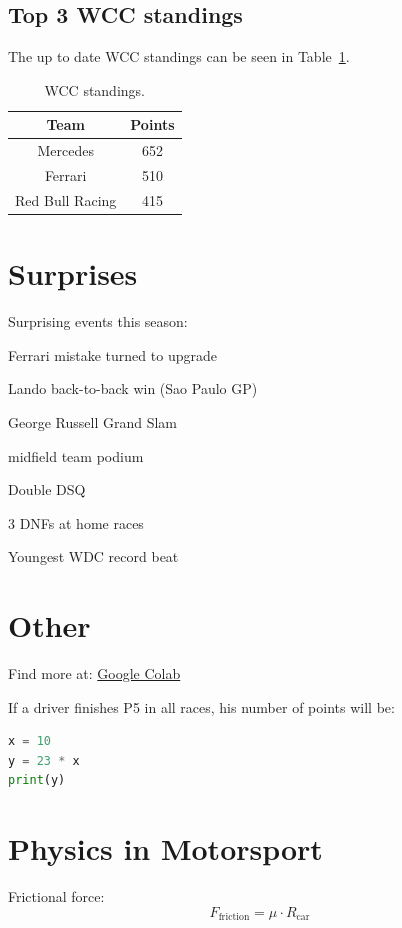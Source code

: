 \documentclass{article}
\newcommand{\cmark}{\ding{51}}
\newcommand{\xmark}{\ding{55}}
\newcommand{\done}{\rlap{$\square$}{\raisebox{2pt}{\large \cmark}}}
\newcommand{\wontfix}{\rlap{$\square$}{\large \xmark}}
\begin{document}
\subsection{Top 3 WCC standings}
The up to date WCC standings can be seen in Table~\ref{tab:data}.

\begin{table}[h]
       \centering

    \begin{tabular}{c c}
        \hline
        Team & Points \\
        \hline
        Mercedes & 652 \\
        Ferrari & 510 \\
        Red Bull Racing & 415 \\
        \hline
    \end{tabular}

    \caption{WCC standings.}
    \label{tab:data}
\end{table}

\section{Surprises}
Surprising events this season:
\begin{todolist}
    \item[\done] Ferrari mistake turned to upgrade
    \item[\done] Lando back-to-back win (Sao Paulo GP)
    \item[\done] George Russell Grand Slam
    \item[\wontfix] midfield team podium
    \item[\wontfix] Double DSQ
    \item[\done] 3 DNFs at home races
    \item[\done] Youngest WDC record beat
\end{todolist}

\section{Other}
Find more at: \href{http://colab.research.google.com/}{Google Colab}

If a driver finishes P5 in all races, his number of points will be:
\begin{lstlisting}[language=Python]
x = 10
y = 23 * x
print(y)
\end{lstlisting}

\section{Physics in Motorsport}
Frictional force:
\[
F_{\text{friction}} = \mu \cdot R_{\text{car}}
\]
\end{document}
